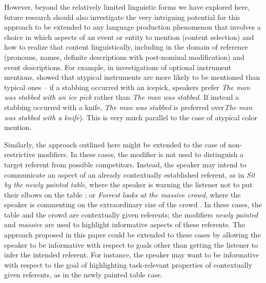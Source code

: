 \documentclass[11pt]{article}
\begin{document}
However, beyond the relatively limited linguistic forms we have explored here, future research should also investigate the very intriguing potential for this approach to be extended to any language production phenomenon that involves a choice in which aspects of an event or entity to mention (content selection) and how to realize that content linguistically, including in the domain of reference (pronouns, names, definite descriptions with post-nominal modification) and event descriptions. For example, in investigations of optional instrument mentions,  showed that atypical instruments are more likely to be mentioned than typical ones -- if a stabbing occurred with an icepick, speakers prefer \emph{The man was stabbed with an ice pick} rather than \emph{The man was stabbed}. If instead a stabbing occurred with a knife, \emph{The man was stabbed} is preferred over\emph{The man was stabbed with a knife}). This is very much parallel to the case of atypical color mention. %

Similarly, the approach outlined here might be extended to the case of non-restrictive modifiers. In these cases, the modifier is not used to distinguish a target referent from possible competitors. Instead, the speaker may intend to communicate an aspect of an already contextually established referent, as in \emph{Sit by the newly painted table}, where the speaker is warning the listener not to put their elbows on the table \cite{dale1995}; or \emph{Forrest looks at the massive crowd}, where the speaker is commenting on the extraordinary size of the crowd \cite{Hahn2018}. In these cases, the table and the crowd are contextually given referents; the modifiers \emph{newly painted} and \emph{massive} are used to highlight informative aspects of these referents. The approach proposed in this paper could be extended to these cases by allowing the speaker to be informative with respect to goals other than getting the listener to infer the intended referent. For instance, the speaker may want to be informative with respect to the goal of highlighting task-relevant properties of contextually given referents, as in the newly painted table case. 
\end{document}
